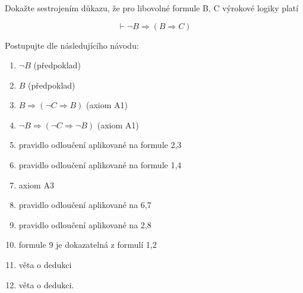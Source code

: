 \subsubsection{}
Dokažte sestrojením důkazu, že pro libovolné formule B, C výrokové
logiky platí

$$\vdash \neg B \Rightarrow (B \Rightarrow C)$$

Postupujte dle následujícího návodu:
\begin{enumerate}
  \item $\neg B$ (předpoklad)
  \item $B$ (předpoklad)
  \item $B \Rightarrow ( \neg C \Rightarrow B)$ (axiom A1)
  \item $\neg B \Rightarrow ( \neg C \Rightarrow \neg B)$ (axiom A1)
  \item pravidlo odloučení aplikované na formule 2,3
  \item pravidlo odloučení aplikované na formule 1,4
  \item axiom A3
  \item pravidlo odloučení aplikované na 6,7
  \item pravidlo odloučení aplikované na 2,8
  \item formule 9 je dokazatelná z formulí 1,2
  \item věta o dedukci
  \item věta o dedukci.
\end{enumerate}
